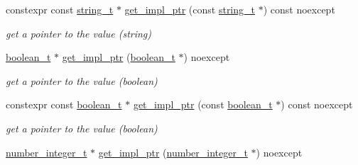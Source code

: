 \begin{DoxyCompactItemize}
constexpr const \mbox{\hyperlink{classnlohmann_1_1basic__json_a61f8566a1a85a424c7266fb531dca005}{string\+\_\+t}} $\ast$ \mbox{\hyperlink{classnlohmann_1_1basic__json_a0c0b516e06d10dced993934ba5139cc0}{get\+\_\+impl\+\_\+ptr}} (const \mbox{\hyperlink{classnlohmann_1_1basic__json_a61f8566a1a85a424c7266fb531dca005}{string\+\_\+t}} $\ast$) const noexcept
\begin{DoxyCompactList}\small\item\em get a pointer to the value (string) \end{DoxyCompactList}\item 
\mbox{\label{classnlohmann_1_1basic__json_ab1678fb6723faf020a15300c4f6b98f5}} 
\mbox{\hyperlink{classnlohmann_1_1basic__json_a4c919102a9b4fe0d588af64801436082}{boolean\+\_\+t}} $\ast$ \mbox{\hyperlink{classnlohmann_1_1basic__json_ab1678fb6723faf020a15300c4f6b98f5}{get\+\_\+impl\+\_\+ptr}} (\mbox{\hyperlink{classnlohmann_1_1basic__json_a4c919102a9b4fe0d588af64801436082}{boolean\+\_\+t}} $\ast$) noexcept
\begin{DoxyCompactList}\small\item\em get a pointer to the value (boolean) \end{DoxyCompactList}\item 
\mbox{\label{classnlohmann_1_1basic__json_ae068eee75c0a814e19208bae641f866c}} 
constexpr const \mbox{\hyperlink{classnlohmann_1_1basic__json_a4c919102a9b4fe0d588af64801436082}{boolean\+\_\+t}} $\ast$ \mbox{\hyperlink{classnlohmann_1_1basic__json_ae068eee75c0a814e19208bae641f866c}{get\+\_\+impl\+\_\+ptr}} (const \mbox{\hyperlink{classnlohmann_1_1basic__json_a4c919102a9b4fe0d588af64801436082}{boolean\+\_\+t}} $\ast$) const noexcept
\begin{DoxyCompactList}\small\item\em get a pointer to the value (boolean) \end{DoxyCompactList}\item 
\mbox{\label{classnlohmann_1_1basic__json_a32a4c3ccdd09b663614adce1834a0a50}} 
\mbox{\hyperlink{classnlohmann_1_1basic__json_a98e611d67b7bd75307de99c9358ab2dc}{number\+\_\+integer\+\_\+t}} $\ast$ \mbox{\hyperlink{classnlohmann_1_1basic__json_a32a4c3ccdd09b663614adce1834a0a50}{get\+\_\+impl\+\_\+ptr}} (\mbox{\hyperlink{classnlohmann_1_1basic__json_a98e611d67b7bd75307de99c9358ab2dc}{number\+\_\+integer\+\_\+t}} $\ast$) noexcept

\end{DoxyCompactItemize}
